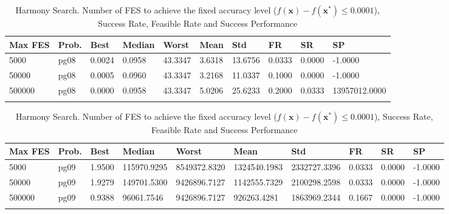 \documentclass[10pt, a4paper]{book}
\begin{document}
\begin{center}
\begin{longtable}{l l l l l l l l l l}
\textbf{Max FES} & \textbf{Prob.} & \textbf{Best} & \textbf{Median} & \textbf{Worst} & \textbf{Mean} & \textbf{Std} & \textbf{FR} & \textbf{SR} & \textbf{SP} \\
\hline
5000 & pg08 & 0.0024 & 0.0958 & 43.3347 & 3.6318 & 13.6756 & 0.0333 & 0.0000 & -1.0000 \\
50000 & pg08 & 0.0005 & 0.0960 & 43.3347 & 3.2168 & 11.0337 & 0.1000 & 0.0000 & -1.0000 \\
500000 & pg08 & 0.0000 & 0.0958 & 43.3347 & 5.0206 & 25.6233 & 0.2000 & 0.0333 & 13957012.0000 \\

\caption{ Harmony Search. Number of FES to achieve the fixed accuracy level ($f(\mathbf{x}) - f(\mathbf{x}^{*}) \leq 0.0001$), Success Rate, Feasible Rate and Success Performance }
\end{longtable}
\end{center}

\begin{center}
\begin{longtable}{l l l l l l l l l l}
\textbf{Max FES} & \textbf{Prob.} & \textbf{Best} & \textbf{Median} & \textbf{Worst} & \textbf{Mean} & \textbf{Std} & \textbf{FR} & \textbf{SR} & \textbf{SP} \\
\hline
5000 & pg09 & 1.9500 & 115970.9295 & 8549372.8320 & 1324540.1983 & 2332727.3396 & 0.0333 & 0.0000 & -1.0000 \\
50000 & pg09 & 1.9279 & 149701.5300 & 9426896.7127 & 1142555.7329 & 2100298.2598 & 0.0333 & 0.0000 & -1.0000 \\
500000 & pg09 & 0.9388 & 96061.7546 & 9426896.7127 & 926263.4281 & 1863969.2344 & 0.1667 & 0.0000 & -1.0000 \\

\caption{ Harmony Search. Number of FES to achieve the fixed accuracy level ($f(\mathbf{x}) - f(\mathbf{x}^{*}) \leq 0.0001$), Success Rate, Feasible Rate and Success Performance }
\end{longtable}
\end{center}
\end{document}
